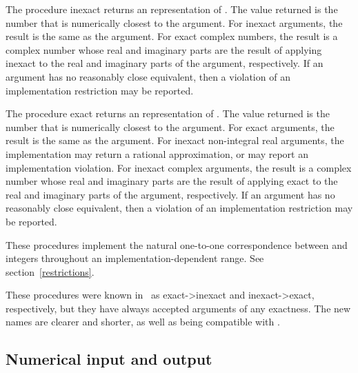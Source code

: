 \begin{entry}{%
}

The procedure {\cf inexact} returns an  representation of .
The value returned is the
 number that is numerically closest to the argument.  
For inexact arguments, the result is the same as the argument. For exact
complex numbers, the result is a complex number whose real and imaginary
parts are the result of applying {\cf inexact} to the real
and imaginary parts of the argument, respectively.
If an  argument has no reasonably close  equivalent,
then a violation of an implementation restriction may be reported.

The procedure {\cf exact} returns an  representation of
.  The value returned is the  number that is numerically
closest to the argument.
For exact arguments, the result is the same as the argument. For inexact
non-integral real arguments, the implementation may return a rational
approximation, or may report an implementation violation. For inexact
complex arguments, the result is a complex number whose real and
imaginary parts are the result of applying {\cf exact} to the
real and imaginary parts of the argument, respectively.
If an  argument has no reasonably close  equivalent,
then a violation of an implementation restriction may be reported.

These procedures implement the natural one-to-one correspondence between
 and  integers throughout an
implementation-dependent range.  See section~\ref{restrictions}.

\begin{note}
These procedures were known in \rfivers\ as {\cf exact->inexact} and
{\cf inexact->exact}, respectively, but they have always accepted
arguments of any exactness.  The new names are clearer and shorter,
as well as being compatible with \rsixrs.
\end{note}

\end{entry}

\medskip

\subsection{Numerical input and output}

